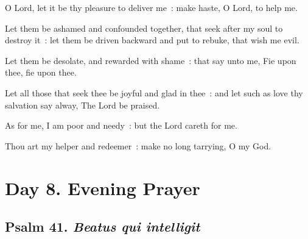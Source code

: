 O Lord, let it be thy pleasure to deliver me~: make haste, O Lord, to help me.\par
{}Let them be ashamed and confounded together, that seek after my soul to destroy it~: let them be driven backward and put to rebuke, that wish me evil.\par
{}Let them be desolate, and rewarded with shame~: that say unto me, Fie upon thee, fie upon thee.\par
{}Let all those that seek thee be joyful and glad in thee~: and let such as love thy salvation say alway, The Lord be praised.\par
{}As for me, I am poor and needy~: but the Lord careth for me.\par
{}Thou art my helper and redeemer~: make no long tarrying, O my God.\par

\section*{Day 8. Evening Prayer}

\subsection{Psalm 41. \textit{Beatus qui intelligit}}


